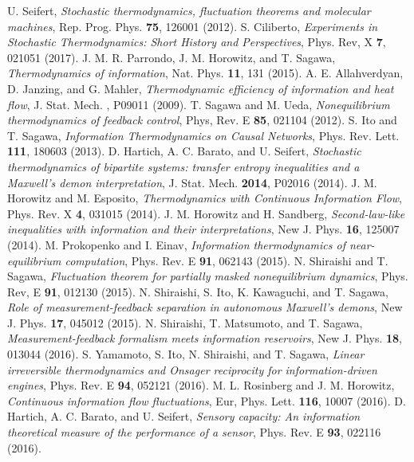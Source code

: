 \documentclass[%
 reprint,
 amsmath,amssymb,
 aps,
]{revtex4-1}
\theoremstyle{plain}
\begin{document}
\begin{thebibliography}{99}
  U. Seifert, {\it Stochastic thermodynamics, fluctuation theorems
and molecular machines}, Rep. Prog. Phys. {\bf 75}, 126001 (2012).
  S. Ciliberto, {\it Experiments in Stochastic Thermodynamics: Short History and Perspectives}, Phys. Rev, X {\bf 7}, 021051 (2017).
  J. M. R. Parrondo, J. M. Horowitz, and T. Sagawa, {\it Thermodynamics of information}, Nat. Phys. {\bf 11}, 131 (2015).
  A. E. Allahverdyan, D. Janzing, and G. Mahler, {\it Thermodynamic efficiency of information and heat flow}, J. Stat. Mech. , P09011 (2009).
  T. Sagawa and M. Ueda, {\it Nonequilibrium thermodynamics of feedback control}, Phys, Rev. E {\bf 85}, 021104 (2012).
  S. Ito and T. Sagawa, {\it Information Thermodynamics on Causal Networks}, Phys. Rev. Lett. {\bf 111}, 180603 (2013).
  D. Hartich, A. C. Barato, and U. Seifert, {\it Stochastic thermodynamics of bipartite systems: transfer entropy inequalities and a Maxwell’s demon interpretation}, J. Stat. Mech. {\bf 2014}, P02016 (2014).
  J. M. Horowitz and M. Esposito, {\it Thermodynamics with Continuous Information Flow}, Phys. Rev. X {\bf 4}, 031015 (2014).
  J. M. Horowitz and H. Sandberg, {\it Second-law-like inequalities with information and their interpretations}, New J. Phys. {\bf 16}, 125007 (2014).
  M. Prokopenko and I. Einav, {\it Information thermodynamics of near-equilibrium computation}, Phys. Rev. E {\bf 91}, 062143 (2015).
  N. Shiraishi and T. Sagawa, {\it Fluctuation theorem for partially masked nonequilibrium dynamics}, Phys. Rev, E {\bf 91}, 012130 (2015).
  N. Shiraishi, S. Ito, K. Kawaguchi, and T. Sagawa, {\it Role of measurement-feedback separation in autonomous Maxwell's demons}, New J. Phys. {\bf 17}, 045012 (2015).
  N. Shiraishi, T. Matsumoto, and T. Sagawa, {\it Measurement-feedback formalism meets information reservoirs}, New J. Phys. {\bf 18}, 013044 (2016).
  S. Yamamoto, S. Ito, N. Shiraishi, and T. Sagawa, {\it Linear irreversible thermodynamics and Onsager reciprocity for information-driven engines}, Phys. Rev. E {\bf 94}, 052121 (2016).
  M. L. Rosinberg and J. M. Horowitz, {\it Continuous information flow fluctuations}, Eur, Phys. Lett. {\bf 116}, 10007 (2016).
  D. Hartich, A. C. Barato, and U. Seifert, {\it Sensory capacity: An information theoretical measure of the performance of a sensor}, Phys. Rev. E {\bf 93}, 022116 (2016).

\end{thebibliography}
\end{document}
